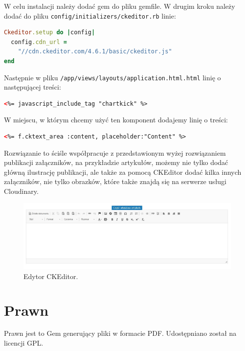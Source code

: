 \documentclass[openright]{xmgr}
\begin{document}
W celu instalacji należy dodać gem do pliku gemfile. W drugim kroku należy dodać do pliku \texttt{config/initializers/ckeditor.rb} linie: 
\begin{lstlisting}[language=ruby, caption={Framgent zawartości pliku ckeditor.rb}]
Ckeditor.setup do |config|
  config.cdn_url = 
	"//cdn.ckeditor.com/4.6.1/basic/ckeditor.js"
end
\end{lstlisting}

\newpage

Następnie w pliku \texttt{/app/views/layouts/application.html.html} linię o następującej treści:
\begin{lstlisting}[language=html, caption={Framgent zawartości pliku application.html.rb}]
<%= javascript_include_tag "chartkick" %>
\end{lstlisting}
W miejscu, w którym chcemy użyć ten komponent dodajemy linię o treści:
\begin{lstlisting}[language=html, caption={Kod uruchamiajacy edytor}]
<%= f.cktext_area :content, placeholder:"Content" %>
\end{lstlisting}
Rozwiązanie to ściśle współpracuje z przedstawionym wyżej rozwiązaniem publikacji załączników, na przykładzie artykułów, możemy nie tylko dodać główną ilustrację publikacji, ale także za pomocą CKEditor dodać kilka innych załączników, nie tylko obrazków, które także znajdą się na serwerze usługi Cloudinary. 

\begin{figure}[!tbh]
\centering
\includegraphics[width=\linewidth]{fig/ckeditor}
\caption{Edytor CKEditor.}
\end{figure}

\newpage

\section{Prawn}
Prawn \cite{prawn} jest to Gem generujący pliki w formacie PDF. Udostępniano został na licencji GPL.
\end{document}
